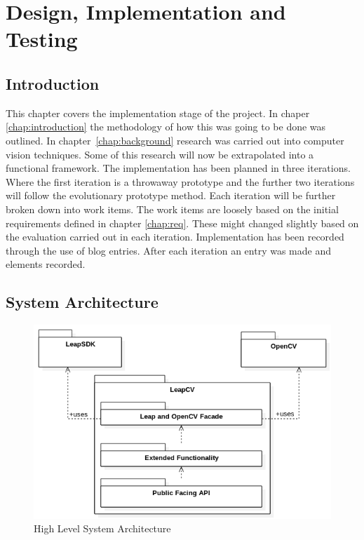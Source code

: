 \documentclass[11pt,oneside]{report}
\begin{document}
	
	\chapter{Design, Implementation and Testing}\label{chap:des&imp}
	\section{Introduction}
	This chapter covers the implementation stage of the project.
	In chaper \ref{chap:introduction} the methodology of how this was going to be done was outlined.
	In chapter~\ref{chap:background} research was carried out into computer vision techniques.
	Some of this research will now be extrapolated into a functional framework.
	The implementation has been planned in three iterations.
	Where the first iteration is a throwaway prototype and the further two iterations will follow the evolutionary prototype method.
	Each iteration will be further broken down into work items.
	The work items are loosely based on the initial requirements defined in chapter \ref{chap:req}.
	These might changed slightly based on the evaluation carried out in each iteration.
	Implementation has been recorded through the use of blog entries.
	After each iteration an entry was made and elements recorded.
	\clearpage
	\section{System Architecture}
	\begin{figure}
			\centering
    			\includegraphics[width=\textwidth]{system_architecture_2}
    			\caption{High Level System Architecture \protect {\label{fig:system_arch_1}}}

	\end{figure}	
			
\end{document}

